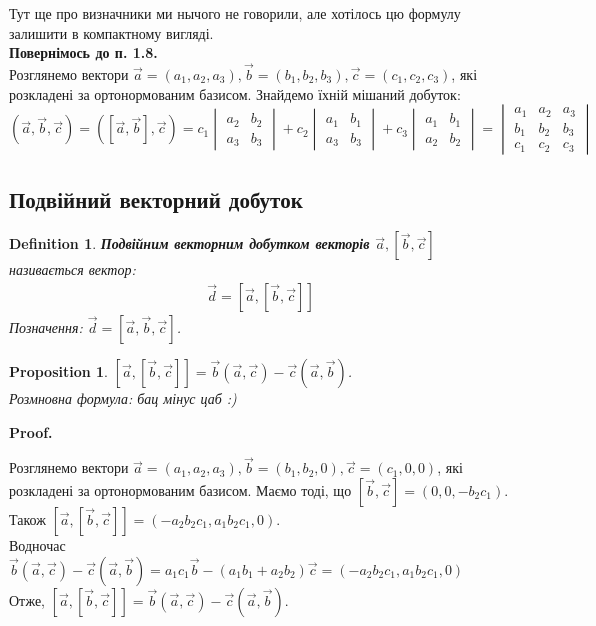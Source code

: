 \documentclass[a4paper, 10pt]{extarticle}
\makeatletter
\def\qed{$\blacksquare$}
\def\qed{$\blacksquare$}
\theoremstyle{theoremdd}
\theoremstyle{theoremdd}
\newtheorem{definition}[theorem]{Definition}
\theoremstyle{theoremdd}
\theoremstyle{theoremdd}
\theoremstyle{theoremdd}
\newtheorem{proposition}[theorem]{Proposition}
\theoremstyle{theoremdd}
\theoremstyle{theoremdd}
\theoremstyle{theoremdd}
\renewenvironment{proof}[1][Proof.\\]{\par
\pushQED{\hfill \qed}%
\normalfont \topsep6\p@\@plus6\p@\relax
\trivlist
\item\relax
{\bfseries
#1\@addpunct{.}}\hspace\labelsep\ignorespaces
}{%
\popQED\endtrivlist\@endpefalse
}
\makeatother
\begin{document}
Тут ще про визначники ми нычого не говорили, але хотілось цю формулу залишити в компактному вигляді.
\bigskip \\
\textbf{Повернімось до п. 1.8.}\\
Розглянемо вектори $\vec{a} = (a_1,a_2,a_3), \vec{b} = (b_1,b_2,b_3), \vec{c} = (c_1,c_2,c_3)$, які розкладені за ортонормованим базисом. Знайдемо їхній мішаний добуток:\\
$(\vec{a}, \vec{b}, \vec{c}) = ([\vec{a}, \vec{b}], \vec{c}) = c_1 \begin{vmatrix} a_2 & b_2 \\ a_3 & b_3 \end{vmatrix} + c_2 \begin{vmatrix} a_1 & b_1 \\ a_3 & b_3 \end{vmatrix} + c_3 \begin{vmatrix} a_1 & b_1 \\ a_2 & b_2 \end{vmatrix} = \begin{vmatrix}
a_1 & a_2 & a_3 \\
b_1 & b_2 & b_3 \\
c_1 & c_2 & c_3
\end{vmatrix}$

\subsection{Подвійний векторний добуток}
\begin{definition}
\textbf{Подвійним векторним добутком векторів $\vec{a}, [\vec{b},\vec{c}]$} називається вектор:
\begin{align*}
\vec{d} = [\vec{a},[\vec{b},\vec{c}]]
\end{align*}
Позначення: $\vec{d} = [\vec{a},\vec{b},\vec{c}]$.
\end{definition}

\begin{proposition}
$[\vec{a},[\vec{b},\vec{c}]] = \vec{b} (\vec{a}, \vec{c}) - \vec{c} (\vec{a}, \vec{b})$.\\
\textit{Розмновна формула: бац мінус цаб :)}
\end{proposition}

\begin{proof}
Розглянемо вектори $\vec{a} = (a_1, a_2, a_3), \vec{b} = (b_1,b_2,0), \vec{c} = (c_1,0,0)$, які розкладені за ортонормованим базисом. Маємо тоді, що $[\vec{b}, \vec{c}] = (0,0,-b_2 c_1)$.\\
Також $[\vec{a}, [\vec{b}, \vec{c}]] = (-a_2b_2c_1, a_1b_2c_1,0)$.\\
Водночас $\vec{b} (\vec{a}, \vec{c}) - \vec{c} (\vec{a}, \vec{b}) = a_1c_1\vec{b} - (a_1b_1+a_2b_2)\vec{c} = (-a_2b_2c_1,a_1b_2c_1,0)$\\
Отже, $[\vec{a},[\vec{b},\vec{c}]] = \vec{b} (\vec{a}, \vec{c}) - \vec{c} (\vec{a}, \vec{b})$.
\end{proof}
\end{document}
